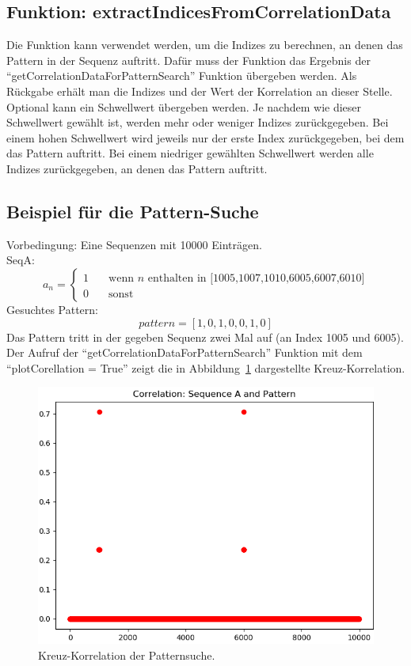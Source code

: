 \subsection{Funktion: extractIndicesFromCorrelationData}
Die Funktion kann verwendet werden, um die Indizes zu berechnen, an denen das Pattern in der Sequenz auftritt. Dafür muss der Funktion das Ergebnis der \enquote{getCorrelationDataForPatternSearch} Funktion
übergeben werden. Als Rückgabe erhält man die Indizes und der Wert der Korrelation an dieser Stelle.\\
Optional kann ein Schwellwert übergeben werden. Je nachdem wie dieser Schwellwert gewählt ist, werden mehr oder weniger Indizes zurückgegeben. Bei einem hohen Schwellwert wird 
jeweils nur der erste Index zurückgegeben, bei dem das Pattern auftritt. Bei einem niedriger gewählten Schwellwert werden alle Indizes zurückgegeben, an denen das Pattern auftritt. 

\subsection{Beispiel für die Pattern-Suche}
Vorbedingung: Eine Sequenzen mit 10000 Einträgen. \\
SeqA:
\[ a_{n} =
  \begin{cases}
    1       & \quad \text{wenn } n \text{ enthalten in [1005,1007,1010,6005,6007,6010]}\\
    0  & \quad \text{sonst}
  \end{cases}
\]
Gesuchtes Pattern:
\[
pattern = [1,0,1,0,0,1,0] 
\]
Das Pattern tritt in der gegeben Sequenz zwei Mal auf (an Index 1005 und 6005).
Der Aufruf der \enquote{getCorrelationDataForPatternSearch} Funktion mit dem \enquote{plotCorellation = True} zeigt die in Abbildung~\ref{fig:patternsearchCorrelation} dargestellte Kreuz-Korrelation.

\begin{figure}[H]
  \includegraphics[width=\linewidth]{./images/patternsearchCorrelation.PNG}
  \caption[Patternsuche: Kreuz-Korrelation]{Kreuz-Korrelation der Patternsuche\footnotemark.}
  \label{fig:patternsearchCorrelation}
\end{figure}

